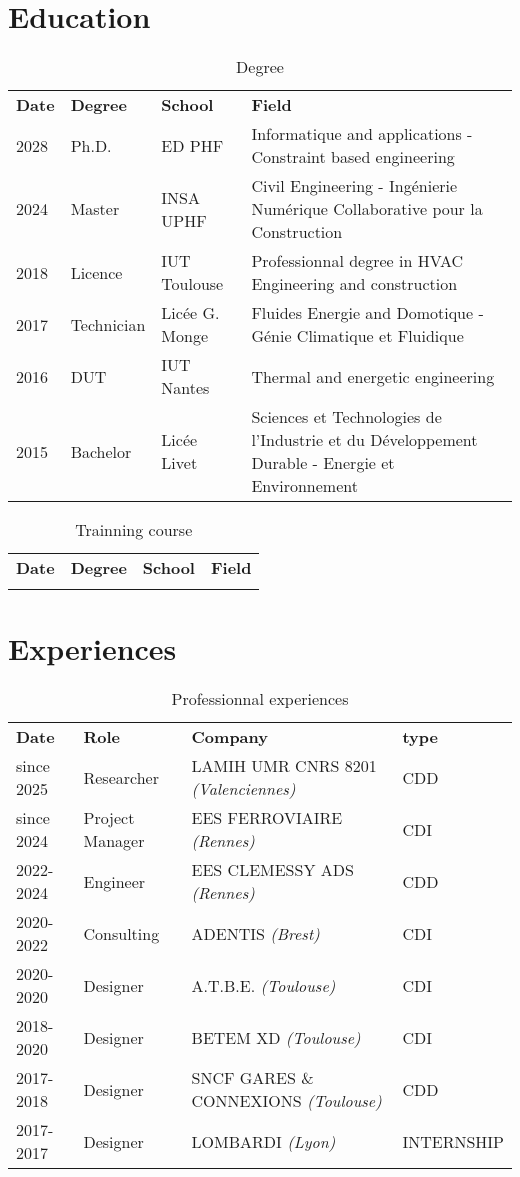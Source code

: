 \documentclass[a4paper,12pt]{article}
\begin{document}
\section{Education}
\label{sec:orgf4c37a0}
\begin{longtable}{|p{2cm}|p{3cm}|p{5cm}|p{7cm}|}
\caption{Degree}
\\
\textbf{Date} & \textbf{Degree} & \textbf{School} & \textbf{Field}\\
2028 & Ph.D. & ED PHF & Informatique and applications - Constraint based engineering\\
2024 & Master & INSA UPHF & Civil Engineering - Ingénierie Numérique Collaborative pour la Construction\\
2018 & Licence & IUT Toulouse & Professionnal degree in HVAC Engineering and construction\\
2017 & Technician & Licée G. Monge & Fluides Energie and Domotique - Génie Climatique et Fluidique\\
2016 & DUT & IUT Nantes & Thermal and energetic engineering\\
2015 & Bachelor & Licée Livet & Sciences et Technologies de l’Industrie et du Développement Durable - Energie et Environnement\\
\end{longtable}

\begin{longtable}{|p{2cm}|p{3cm}|p{5cm}|p{7cm}|}
\caption{Trainning course}
\\
\textbf{Date} & \textbf{Degree} & \textbf{School} & \textbf{Field}\\
 &  &  & \\
\end{longtable}
\section{Experiences}
\label{sec:orgaab181f}
\begin{longtable}{|p{2cm}|p{3cm}|p{5cm}|p{7cm}|}
\caption{Professionnal experiences}
\\
\textbf{Date} & \textbf{Role} & \textbf{Company} & \textbf{type}\\
since 2025 & Researcher & LAMIH UMR CNRS 8201 \emph{(Valenciennes)} & CDD\\
since 2024 & Project Manager & EES FERROVIAIRE \emph{(Rennes)} & CDI\\
2022-2024 & Engineer & EES CLEMESSY ADS \emph{(Rennes)} & CDD\\
2020-2022 & Consulting & ADENTIS \emph{(Brest)} & CDI\\
2020-2020 & Designer & A.T.B.E. \emph{(Toulouse)} & CDI\\
2018-2020 & Designer & BETEM XD \emph{(Toulouse)} & CDI\\
2017-2018 & Designer & SNCF GARES \& CONNEXIONS \emph{(Toulouse)} & CDD\\
2017-2017 & Designer & LOMBARDI \emph{(Lyon)} & INTERNSHIP\\
\end{longtable}
\end{document}
